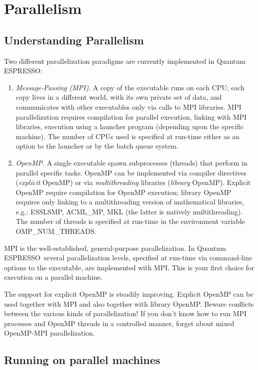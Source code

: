\documentclass[12pt,a4paper]{article}
\def\qe{{\sc Quantum ESPRESSO}}
\begin{document}
\newpage

\section{Parallelism}
\label{Sec:para}

\subsection{Understanding Parallelism}

Two different parallelization paradigms are currently implemented
in \qe:
\begin{enumerate}
\item {\em Message-Passing (MPI)}. A copy of the executable runs
on each CPU; each copy lives in a different world, with its own
private set of data, and communicates with other executables only
via calls to MPI libraries. MPI parallelization requires compilation
for parallel execution, linking with MPI libraries, execution using
a launcher program (depending upon the specific machine). The number of CPUs used
is specified at run-time either as an option to the launcher or
by the batch queue system.
\item {\em OpenMP}.  A single executable spawn subprocesses
(threads) that perform in parallel specific tasks.
OpenMP can be implemented via compiler directives ({\em explicit}
OpenMP) or via {\em multithreading} libraries  ({\em library} OpenMP).
Explicit OpenMP require compilation for OpenMP execution;
library OpenMP requires only linking to a multithreading
version of mathematical libraries, e.g.:
ESSLSMP, ACML\_MP, MKL (the latter is natively multithreading).
The number of threads is specified at run-time in the environment
variable OMP\_NUM\_THREADS.
\end{enumerate}

MPI is the well-established, general-purpose parallelization.
In \qe\ several parallelization levels, specified at run-time
via command-line options to the executable, are implemented
with MPI. This is your first choice for execution on a parallel
machine.

The support for explicit OpenMP is steadily improving.
Explicit OpenMP can be used together with MPI and also 
together with library OpenMP. Beware
conflicts between the various kinds of parallelization!
If you don't know how to run MPI processes
and OpenMP threads in a controlled manner, forget about mixed
OpenMP-MPI parallelization.

\subsection{Running on parallel machines}
\end{document}
